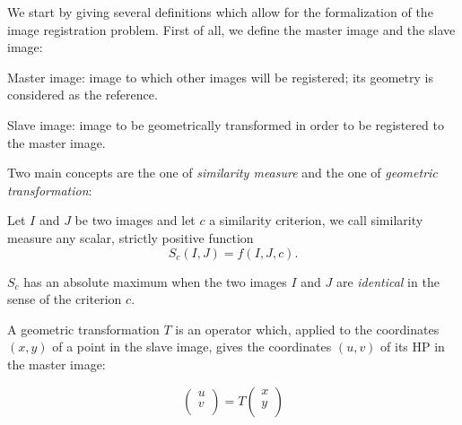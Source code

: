 We start by giving several definitions which allow for the
formalization of the image registration problem. First of all, we
define the master image and the slave image:
\begin{defin}
Master image: image to which other images will be registered; its
geometry is considered as the reference.
\end{defin}

\begin{defin}
Slave image: image to be geometrically transformed in order to be
registered to the master image.
\end{defin}

Two main concepts are the one of {\em similarity measure} and the one
of {\em geometric transformation}:
\begin{defin}
\label{def-simil}Let $I$ and $J$ be two images and let $c$ a similarity
criterion, we call similarity measure any scalar, strictly positive function 
\begin{equation}
S_c(I,J) = f(I,J,c).
\end{equation}

$S_c$ has an absolute maximum when the two images $I$ and $J$
are {\it identical} in the sense of the criterion $c$.\\
\end{defin}

\begin{defin}\label{defin-T}
A geometric transformation $T$ is an operator which, applied to the
coordinates $(x,y)$ of a point in the slave image, gives the
coordinates $(u,v)$ of its HP in the master image:

\begin{equation}
\left( \begin{array}{c}
u\\
v\\
\end{array}\right) = T \left( \begin{array}{c}
x\\
y\\
\end{array}\right)
\label{Tgeom}
\end{equation}

\end{defin}

